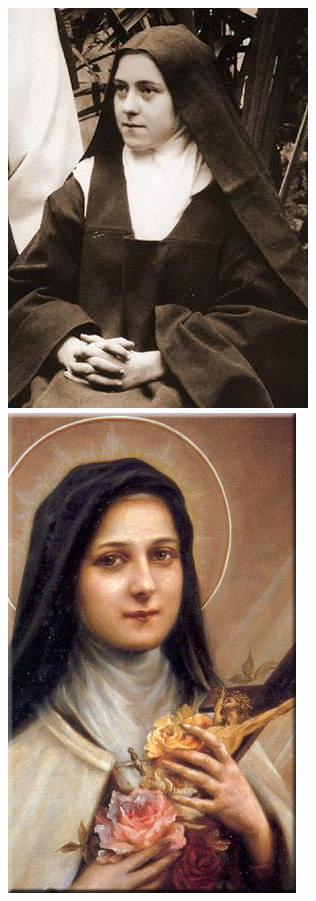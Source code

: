 \documentclass[a5paper,headsepline,titlepage,11pt,nnormalheadings,DIVcalc,openany]{scrbook}
\newcounter{nourut}
\begin{document}
\clearpage%
\includegraphics[scale=0.35]{./theresia-2.jpg}
\clearpage%
\includegraphics[scale=0.275]{./theresia-3.jpg}
\clearpage%
\setcounter{nourut}{0}
\setcounter{nourut}{0}
\end{document}
